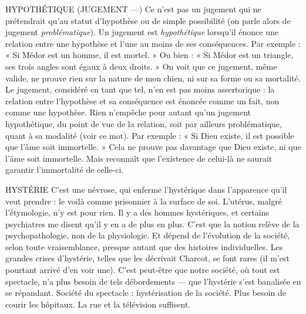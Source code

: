 HYPOTHÉTIQUE (JUGEMENT —) Ce n’est pas un jugement qui ne prétendrait
qu’au statut d’hypothèse ou
de simple possibilité (on parle alors de jugement {\it problématique}). Un jugement
est {\it hypothétique} lorsqu'il énonce une relation entre une hypothèse et l’une au
moins de ses conséquences. Par exemple : « Si Médor est un homme, il est
mortel. » Ou bien : « Si Médor est un triangle, ses trois angles sont égaux à
deux droits. » On voit que ce jugement, même valide, ne prouve rien sur la
nature de mon chien, ni sur sa forme ou sa mortalité. Le jugement, considéré
en tant que tel, n’en est pas moins assertorique : la relation entre l’hypothèse et
sa conséquence est énoncée comme un fait, non comme une hypothèse. Rien
n'empêche pour autant qu’un jugement hypothétique, du point de vue de la
relation, soit par ailleurs problématique, quant à sa modalité (voir ce mot). Par
exemple : « Si Dieu existe, il est possible que l’âme soit immortelle. » Cela ne
prouve pas davantage que Dieu existe, ni que l’âme soit immortelle. Mais
reconnaît que l'existence de celui-là ne saurait garantir l’immortalité de celle-ci.

HYSTÉRIE C’est une névrose, qui enferme l’hystérique dans l'apparence
qu’il veut prendre : le voilà comme prisonnier à la surface de
soi. L’utérus, malgré l’étymologie, n’y est pour rien. Il y a des hommes hystériques,
et certains psychiatres me disent qu’il y en a de plus en plus. C’est que
la notion relève de la psychopathologie, non de la physiologie. Et dépend de
l’évolution de la société, selon toute vraisemblance, presque autant que des histoires
individuelles. Les grandes crises d’hystérie, telles que les décrivait
Charcot, se font rares (il m’est pourtant arrivé d’en voir une). C’est peut-être
que notre société, où tout est spectacle, n’a plus besoin de tels débordements —
que l’hystérie s’est banalisée en se répandant. Société du spectacle : hystérisation
de la société. Plus besoin de courir les hôpitaux. La rue et la télévision suffisent.


